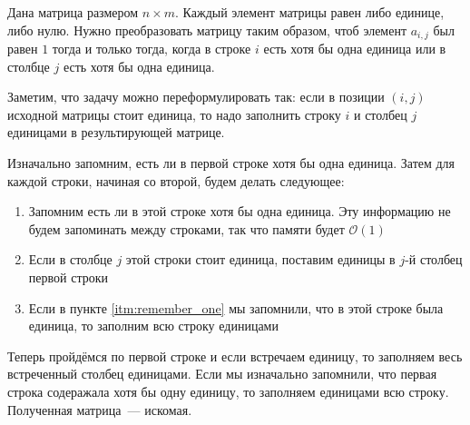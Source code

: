 \documentclass[addpoints]{exam}
\begin{document}
\begin{questions}
\question Дана матрица размером $n \times m$. Каждый элемент матрицы равен либо единице, либо нулю. Нужно преобразовать матрицу таким образом, чтоб элемент $a_{i,j}$ был равен $1$ тогда и только тогда, когда в строке $i$ есть хотя бы одна единица или в столбце $j$ есть хотя бы одна единица. 


\begin{solution}

Заметим, что задачу можно переформулировать так: если в позиции $(i,j)$ исходной матрицы стоит единица, то надо заполнить строку $i$ и столбец $j$ единицами в результирующей матрице.

Изначально запомним, есть ли в первой строке хотя бы одна единица. Затем для каждой строки, начиная со второй, будем делать следующее:

\begin{enumerate}

\item \label{itm:remember_one} Запомним есть ли в этой строке хотя бы одна единица. Эту информацию не будем запоминать между строками, так что памяти будет $\mathcal{O}(1)$

\item Если в столбце $j$ этой строки стоит единица, поставим единицы в $j$-й столбец первой строки

\item Если в пункте \ref{itm:remember_one} мы запомнили, что в этой строке была единица, то заполним всю строку единицами

\end{enumerate}

Теперь пройдёмся по первой строке и если встречаем единицу, то заполняем весь встреченный столбец единицами. Если мы изначально запомнили, что первая строка содеражала хотя бы одну единицу, то заполняем единицами всю строку. Полученная матрица~--- искомая.


\end{solution}
\end{questions}
\end{document}
